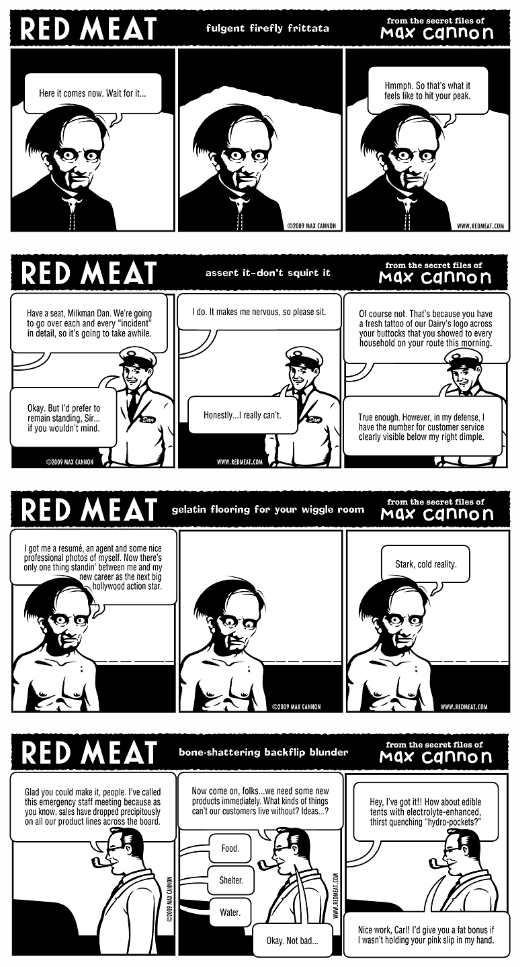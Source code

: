 \documentclass[a4paper,twoside,11pt]{article}
\begin{document}
\includegraphics[width=\textwidth]{redmeat_2009-01-13.png}



\includegraphics[width=\textwidth]{redmeat_2009-01-20.png}



\includegraphics[width=\textwidth]{redmeat_2009-01-27.png}



\includegraphics[width=\textwidth]{redmeat_2009-02-03.png}
\end{document}
